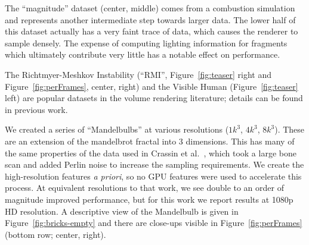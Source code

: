 The ``magnitude'' dataset (center, middle) comes from a combustion
simulation and represents another intermediate step towards larger
data.  The lower half of this dataset actually has a very faint trace
of data, which causes the renderer to sample densely.  The expense
of computing lighting information for fragments which ultimately
contribute very little has a notable effect on performance.

The Richtmyer-Meshkov Instability (``RMI'',
Figure~\ref{fig:teaser} right and Figure~\ref{fig:perFrames}, center,
right) and the Visible Human (Figure~\ref{fig:teaser} left) are popular
datasets in the volume rendering literature; details can be found in
previous work.

We created a series of ``Mandelbulbs'' at various resolutions ($1k^3$,
$4k^3$, $8k^3$).  These are an extension of the mandelbrot fractal into
3 dimensions.  This has many of the same properties of the data used in
Crassin et al.~\cite{Crassin:2009:Gigavoxels}, which took a large bone
scan and added Perlin noise to increase the sampling requirements.  We
create the high-resolution features \textit{a priori}, so no GPU
features were used to accelerate this process.  At equivalent
resolutions to that work, we see double to an order of magnitude
improved performance, but for this work we report results at 1080p HD
resolution.  A descriptive view of the Mandelbulb is
given in Figure~\ref{fig:bricks-empty} and there
are close-ups visible in Figure~\ref{fig:perFrames} (bottom row;
center, right).

